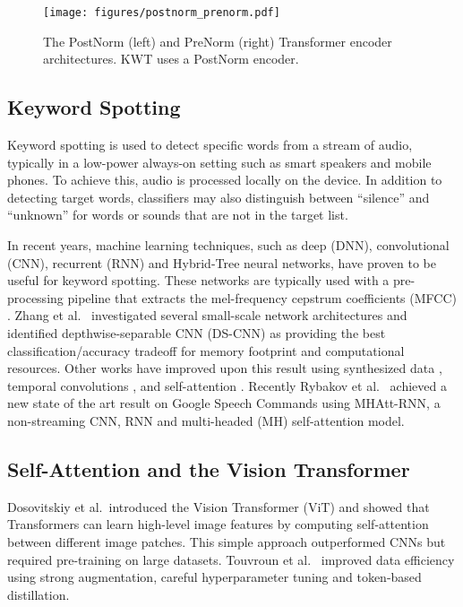 \documentclass[a4paper]{article}
\begin{document}
\begin{figure}[t]
  \centering
  \texttt{[image: figures/postnorm\_prenorm.pdf]}
  \caption{The PostNorm (left) and PreNorm (right) Transformer encoder architectures. KWT uses a PostNorm encoder.}
  \label{fig:norm}
\end{figure}

\subsection{Keyword Spotting}

Keyword spotting is used to detect specific words from a stream of audio, typically in a low-power always-on setting such as smart speakers and mobile phones. To achieve this, audio is processed locally on the device. In addition to detecting target words, classifiers may also distinguish between ``silence'' and ``unknown'' for words or sounds that are not in the target list.

In recent years, machine learning techniques, such as deep (DNN), convolutional (CNN), recurrent (RNN) and Hybrid-Tree \cite{MLSYS2019_a97da629} neural networks, have proven to be useful for keyword spotting. These networks are typically used with a pre-processing pipeline that extracts the mel-frequency cepstrum coefficients (MFCC) \cite{davis1980comparison}. Zhang et al.\ \cite{zhang2017hello} investigated several small-scale network architectures and identified depthwise-separable CNN (DS-CNN) as providing the best classification/accuracy tradeoff for memory footprint and computational resources. Other works have improved upon this result using synthesized data \cite{lin2020training}, temporal convolutions \cite{choi2019temporal, majumdar2020matchboxnet}, and self-attention \cite{de2018neural}. Recently Rybakov et al.\ \cite{rybakov2020streaming}  achieved a new state of the art result on Google Speech Commands using MHAtt-RNN, a non-streaming CNN, RNN and multi-headed (MH) self-attention model.


\subsection{Self-Attention and the Vision Transformer}

Dosovitskiy et al.\ introduced the Vision Transformer (ViT) \cite{dosovitskiy2020image} and showed that Transformers can learn high-level image features by computing self-attention between different image patches. This simple approach outperformed CNNs but required pre-training on large datasets. Touvroun et al.\ \cite{touvron2020training} improved data efficiency using strong augmentation, careful hyperparameter tuning and token-based distillation.
\end{document}

